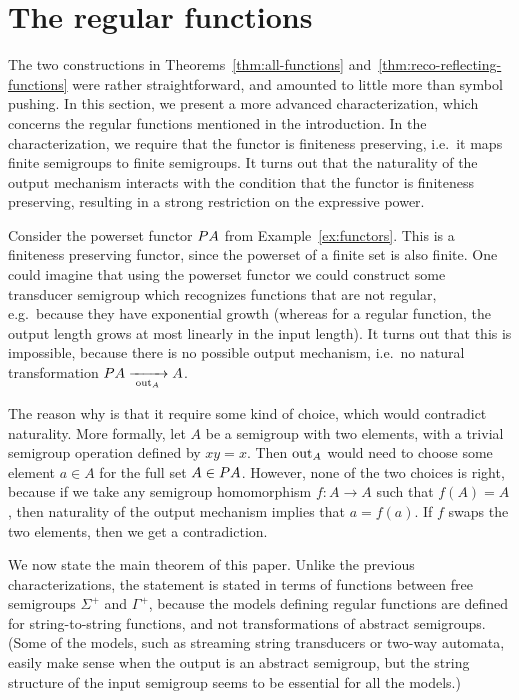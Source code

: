 

\section{The regular functions}
\label{sec:reg-char}
The two constructions in Theorems~\ref{thm:all-functions} and~\ref{thm:reco-reflecting-functions} were rather straightforward, and amounted to little more than symbol pushing. In this section, we present a more advanced  characterization, which concerns  the regular functions mentioned in the introduction.
In the characterization, we require that the functor is finiteness preserving, i.e.~it maps finite semigroups to finite semigroups. It turns out that the naturality of the output mechanism interacts with the condition that 
the functor is finiteness preserving, resulting in a strong restriction on the expressive power.

\begin{example}
    Consider the powerset functor $\powerset A$ from Example~\ref{ex:functors}. This is a finiteness preserving functor, since the powerset of a finite set is also finite. One could imagine that using the powerset functor we could construct some transducer semigroup which recognizes functions that are not regular, e.g.~because they have exponential growth (whereas for a regular function, the output length grows at most linearly in the input length). It turns out that this is impossible, because there is no possible output mechanism, i.e.~no natural transformation $\powerset A \xrightarrow[\;\outfun_A\;]{} A$.

    The reason why is that it require some kind of choice, which would contradict naturality. More formally, let $A$ be a semigroup with two elements, with a trivial semigroup operation defined by $xy=x$. Then $\mathrm{out}_A$ would need to choose some element $a \in A$ for the full set $A \in \powerset A$. However, none of the two choices is right, because if we take any semigroup homomorphism $f : A \to A$ such that $f(A)=A$, then  naturality of the output mechanism implies that $a=f(a)$. If $f$ swaps the two elements, then we get a contradiction.
\end{example}


We now state the main theorem of this paper. Unlike the previous characterizations, the statement is stated in terms of functions between free semigroups $\Sigma^+$ and $\Gamma^+$, because the models defining regular functions are defined for string-to-string functions, and not transformations of abstract semigroups. (Some of the models, such as streaming string transducers or two-way automata, easily make sense when the output is an abstract semigroup, but the string structure of the input semigroup seems to be essential for all the models.) 


